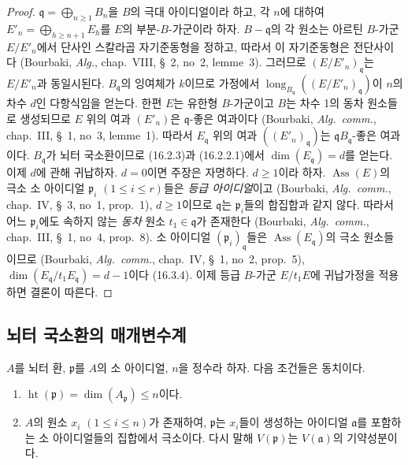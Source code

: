 \begin{proof}
$\mathfrak{q}=\bigoplus_{n\geq1}B_n$을 $B$의 극대 아이디얼이라 하고,
각 $n$에 대하여 $E'_n=\bigoplus_{h\geq n+1}E_h$를 $E$의
부분-$B$-가군이라 하자. $B-\mathfrak{q}$의 각 원소는 아르틴
$B$-가군 $E/E'_n$에서 단사인 스칼라곱 자기준동형을 정하고, 따라서
이 자기준동형은 전단사이다 (Bourbaki, \emph{Alg.}, chap.~VIII,
\S~2, no~2, lemme~3). 그러므로
$(E/E'_n)_{\mathfrak{q}}$는 $E/E'_n$과 동일시된다.
$B_{\mathfrak{q}}$의 잉여체가 $k$이므로 가정에서
$\operatorname{long}_{B_{\mathfrak{q}}}
((E/E'_n)_{\mathfrak{q}})$이 $n$의 차수 $d$인 다항식임을 얻는다.
한편 $E$는 유한형
$B$-가군이고 $B$는 차수 1의 동차 원소들로 생성되므로 $E$ 위의
여과 $(E'_n)$은 $\mathfrak{q}$-좋은 여과이다 (Bourbaki,
\emph{Alg.~comm.}, chap.~III, \S~1, no~3, lemme~1). 따라서
$E_{\mathfrak{q}}$ 위의 여과 $((E'_n)_{\mathfrak{q}})$는
$\mathfrak{q}B_{\mathfrak{q}}$-좋은 여과이다.
$B_{\mathfrak{q}}$가 뇌터 국소환이므로 (16.2.3)과 (16.2.2.1)에서
$\dim(E_{\mathfrak{q}})=d$를 얻는다. 이제 $d$에 관해 귀납하자.
$d=0$이면 주장은 자명하다. $d\geq1$이라 하자.
$\operatorname{Ass}(E)$의 극소 소 아이디얼 $\mathfrak{p}_i$
$(1\leq i\leq r)$들은 \emph{등급 아이디얼}이고 (Bourbaki,
\emph{Alg.~comm.}, chap.~IV, \S~3, no~1, prop.~1), $d\geq1$이므로
$\mathfrak{q}$는 $\mathfrak{p}_i$들의 합집합과 같지 않다. 따라서
어느 $\mathfrak{p}_i$에도 속하지 않는 \emph{동차} 원소
$t_1\in\mathfrak{q}$가 존재한다 (Bourbaki,
\emph{Alg.~comm.}, chap.~III, \S~1, no~4, prop.~8).
소 아이디얼 $(\mathfrak{p}_i)_{\mathfrak{q}}$들은
$\operatorname{Ass}(E_{\mathfrak{q}})$의 극소 원소들이므로
(Bourbaki, \emph{Alg.~comm.}, chap.~IV, \S~1, no~2, prop.~5),
$\dim(E_{\mathfrak{q}}/t_1E_{\mathfrak{q}})=d-1$이다 (16.3.4).
이제 등급 $B$-가군 $E/t_1E$에 귀납가정을 적용하면
결론이 따른다.
\end{proof}

\subsection{뇌터 국소환의 매개변수계}
\label{subsection:0.16.3-fr}

\begin{proposition}[16.3.1]
\label{0.16.3.1-fr}
$A$를 뇌터 환, $\mathfrak{p}$를 $A$의 소 아이디얼, $n$을 정수라
하자. 다음 조건들은 동치이다.
\begin{enumerate}
  \item[$a)$] $\operatorname{ht}(\mathfrak{p})=
  \dim(A_{\mathfrak{p}})\leq n$이다.
  \item[$b)$] $A$의 원소 $x_i$ $(1\leq i\leq n)$가 존재하여,
  $\mathfrak{p}$는 $x_i$들이 생성하는 아이디얼 $\mathfrak{a}$를
  포함하는 소 아이디얼들의 집합에서 극소이다. 다시 말해
  $V(\mathfrak{p})$는 $V(\mathfrak{a})$의 기약성분이다.
\end{enumerate}
\end{proposition}

